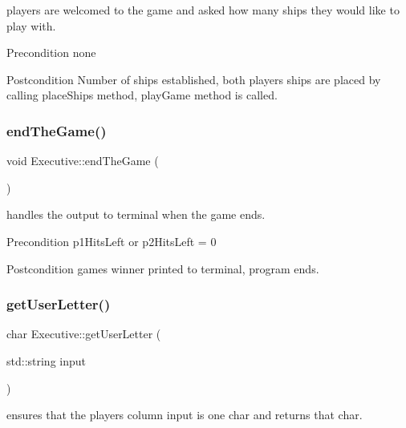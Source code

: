players are welcomed to the game and asked how many ships they would like to play with. 

\begin{DoxyPrecond}{Precondition}
none 
\end{DoxyPrecond}
\begin{DoxyPostcond}{Postcondition}
Number of ships established, both player\textquotesingle{}s ships are placed by calling place\+Ships method, play\+Game method is called. 
\end{DoxyPostcond}
\mbox{\label{classExecutive_a7ecea33073bc684a8efdd3bd08f724e3}} 
\subsubsection{\texorpdfstring{end\+The\+Game()}{endTheGame()}}
{\footnotesize\ttfamily void Executive\+::end\+The\+Game (\begin{DoxyParamCaption}{ }\end{DoxyParamCaption})}



handles the output to terminal when the game ends. 

\begin{DoxyPrecond}{Precondition}
p1\+Hits\+Left or p2\+Hits\+Left = 0 
\end{DoxyPrecond}
\begin{DoxyPostcond}{Postcondition}
game\textquotesingle{}s winner printed to terminal, program ends. 
\end{DoxyPostcond}
\mbox{\label{classExecutive_afeb631927beaf50e17e5a0ee0b85895f}} 
\subsubsection{\texorpdfstring{get\+User\+Letter()}{getUserLetter()}}
{\footnotesize\ttfamily char Executive\+::get\+User\+Letter (\begin{DoxyParamCaption}\item[{std\+::string}]{input }\end{DoxyParamCaption})}



ensures that the player\textquotesingle{}s column input is one char and returns that char. 

